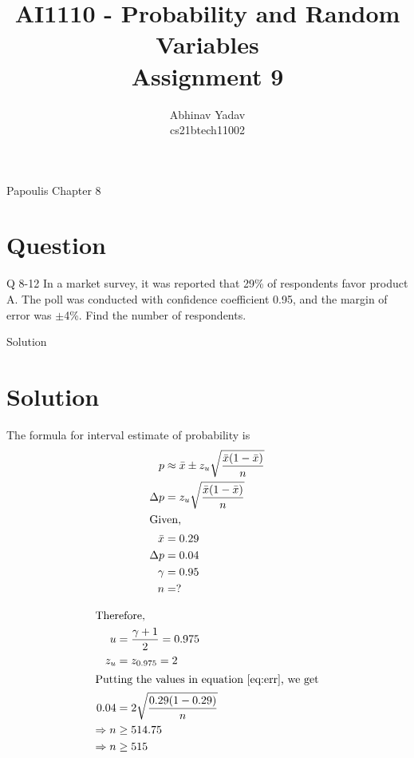 \documentclass{beamer}
\title{AI1110 - Probability and Random Variables \\
        Assignment 9}
\author{Abhinav Yadav \\ 
        cs21btech11002}
\begin{document}
\maketitle

\begin{frame}{Papoulis Chapter 8}
    \section{Question}
    \begin{block}{Q 8-12}
        In a market survey, it was reported that 29\% of respondents favor product A. The poll was
        conducted with confidence coefficient 0.95, and the margin of error was $\pm$4\%. Find the
        number of respondents.
    \end{block}
\end{frame}

\begin{frame}[allowframebreaks]{Solution}
    \section{Solution}
    \begin{block}{}
        The formula for interval estimate of probability is
        \begin{align}
            p        & \approx \bar x \pm z_u \sqrt{\frac{\bar x(1-\bar x)}{n}} \\
            \label{eq:err}
            \Delta p & = z_u \sqrt{\frac{\bar x(1-\bar x)}{n}}                  \\
            \intertext{Given,}
            \bar x   & = 0.29                                                   \\
            \Delta p & = 0.04                                                   \\
            \gamma   & = 0.95                                                   \\
            n        & = ?
        \end{align}
    \end{block}
    \pagebreak
    \begin{block}
        \pagebreak
        \begin{align}
            \intertext{Therefore,}
            u             & = \frac{\gamma+1}{2} = 0.975     \\
            z_u           & = z_{0.975} = 2                  \\
            \intertext{Putting the values in equation \autoref{eq:err}, we get}
            0.04          & = 2\sqrt{\frac{0.29(1-0.29)}{n}} \\
            \Rightarrow n & \ge 514.75                       \\
            \Rightarrow n & \ge 515
        \end{align}
    \end{block}

\end{frame}
\end{document}
